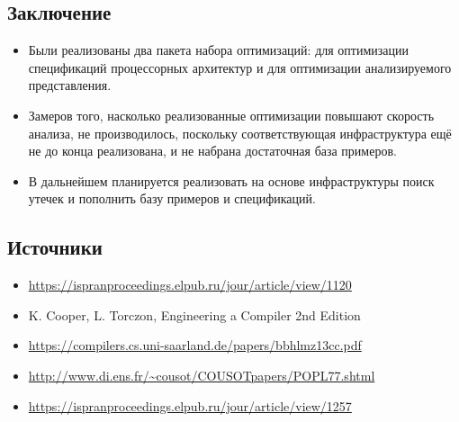 \documentclass[11pt]{article}
\begin{document}
\subsection{Заключение}
\label{sec:org074f1e5}
\begin{itemize}
\item Были реализованы два пакета набора оптимизаций: для оптимизации спецификаций процессорных архитектур и для оптимизации анализируемого представления.
\item Замеров того, насколько реализованные оптимизации повышают скорость анализа, не производилось, поскольку соответствующая инфраструктура ещё не до конца реализована, и не набрана достаточная база примеров.
\item В дальнейшем планируется реализовать на основе инфраструктуры поиск утечек и пополнить базу примеров и спецификаций.
\end{itemize}
\subsection{Источники}
\label{sec:org7264934}
\begin{itemize}
\item \url{https://ispranproceedings.elpub.ru/jour/article/view/1120} \\
\item K. Cooper, L. Torczon, Engineering a Compiler 2nd Edition \\
\item \url{https://compilers.cs.uni-saarland.de/papers/bbhlmz13cc.pdf} \\
\item \url{http://www.di.ens.fr/\~cousot/COUSOTpapers/POPL77.shtml} \\
\item \url{https://ispranproceedings.elpub.ru/jour/article/view/1257}
\end{itemize}
\end{document}
